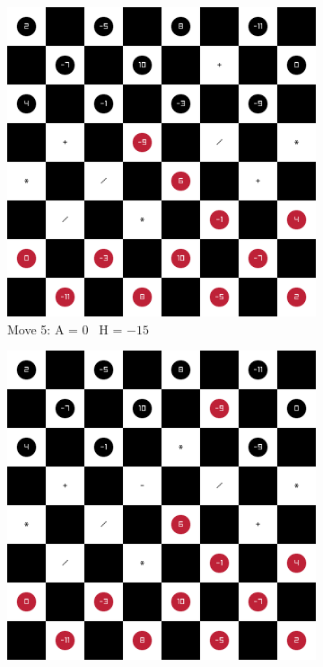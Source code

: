 \begin{figure}[H]
\begin{subfigure}{0.3\textwidth}
        \includegraphics[width=\textwidth]{images/games/game1/move_6.png}
        \caption*{Move 5: A = 0 \textbar\ H = $-15$}
    \end{subfigure}
    \quad
    \begin{subfigure}{0.3\textwidth}
        \centering
        \includegraphics[width=\textwidth]{images/games/game1/move_7.png}

\end{subfigure}
\end{figure}

